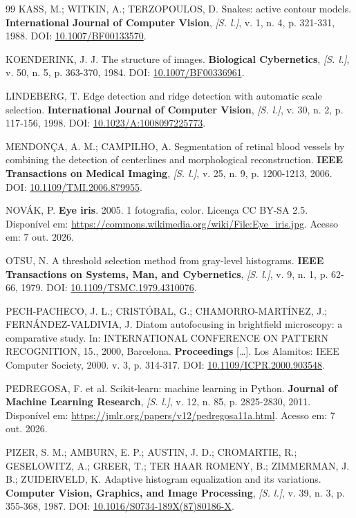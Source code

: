 \documentclass[12pt, oneside, a4paper, chapter=TITLE, section=TITLE,
               english, brazil]{abntex2}
\newcommand{\doi}[1]{DOI: \href{https://doi.org/#1}{#1}}
\newcommand{\semlocal}{\textit{[S. l.]}}
\begin{document}
\begin{thebibliography}{99}
KASS, M.; WITKIN, A.; TERZOPOULOS, D. Snakes: active contour models.
\textbf{International Journal of Computer Vision}, \semlocal, v. 1, n. 4,
p. 321-331, 1988. \doi{10.1007/BF00133570}.

KOENDERINK, J. J. The structure of images. \textbf{Biological Cybernetics},
\semlocal, v. 50, n. 5, p. 363-370, 1984. \doi{10.1007/BF00336961}.

LINDEBERG, T. Edge detection and ridge detection with automatic scale
selection. \textbf{International Journal of Computer Vision}, \semlocal,
v. 30, n. 2, p. 117-156, 1998. \doi{10.1023/A:1008097225773}.

MENDONÇA, A. M.; CAMPILHO, A. Segmentation of retinal blood vessels by
combining the detection of centerlines and morphological reconstruction.
\textbf{IEEE Transactions on Medical Imaging}, \semlocal, v. 25, n. 9,
p. 1200-1213, 2006. \doi{10.1109/TMI.2006.879955}.

NOVÁK, P. \textbf{Eye iris}. 2005. 1 fotografia, color. Licença CC BY-SA 2.5.
Disponível em: \url{https://commons.wikimedia.org/wiki/File:Eye_iris.jpg}.
Acesso em: 7 out. 2026.

OTSU, N. A threshold selection method from gray-level histograms.
\textbf{IEEE Transactions on Systems, Man, and Cybernetics}, \semlocal, v. 9,
n. 1, p. 62-66, 1979. \doi{10.1109/TSMC.1979.4310076}.

PECH-PACHECO, J. L.; CRISTÓBAL, G.; CHAMORRO-MARTÍNEZ, J.;
FERNÁNDEZ-VALDIVIA, J. Diatom autofocusing in brightfield microscopy: a
comparative study. In: INTERNATIONAL CONFERENCE ON PATTERN RECOGNITION, 15.,
2000, Barcelona. \textbf{Proceedings} [\dots]. Los Alamitos: IEEE Computer
Society, 2000. v. 3, p. 314-317. \doi{10.1109/ICPR.2000.903548}.

PEDREGOSA, F. et al. Scikit-learn: machine learning in Python.
\textbf{Journal of Machine Learning Research}, \semlocal, v. 12, n. 85,
p. 2825-2830, 2011. Disponível em:
\url{https://jmlr.org/papers/v12/pedregosa11a.html}. Acesso em: 7 out. 2026.

PIZER, S. M.; AMBURN, E. P.; AUSTIN, J. D.; CROMARTIE, R.; GESELOWITZ, A.;
GREER, T.; TER HAAR ROMENY, B.; ZIMMERMAN, J. B.; ZUIDERVELD, K. Adaptive
histogram equalization and its variations. \textbf{Computer Vision, Graphics,
and Image Processing}, \semlocal, v. 39, n. 3, p. 355-368, 1987.
\doi{10.1016/S0734-189X(87)80186-X}.


\end{thebibliography}
\end{document}

